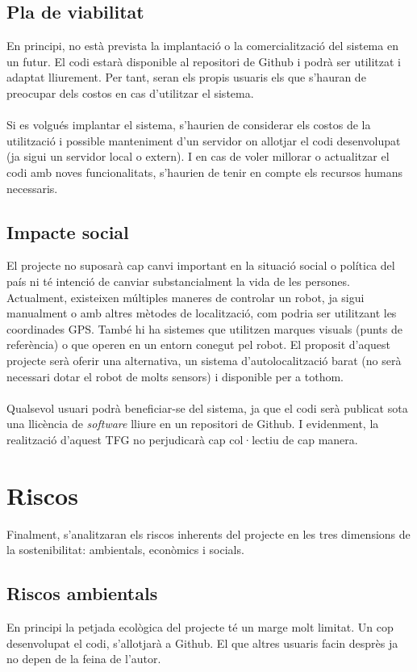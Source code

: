 	\subsection{Pla de viabilitat}
		En principi, no està prevista la implantació o la comercialització del sistema en un futur. El codi estarà disponible al repositori de Github i podrà ser utilitzat i adaptat lliurement. Per tant,
		seran els propis usuaris els que s'hauran de preocupar dels costos en cas d'utilitzar el sistema.\\\\
		Si es volgués implantar el sistema, s'haurien de considerar els costos de la utilització i possible manteniment d'un servidor on allotjar el codi desenvolupat (ja sigui un servidor local o extern). I en
		cas de voler millorar o actualitzar el codi amb noves funcionalitats, s'haurien de tenir en compte els recursos humans necessaris.

	\subsection{Impacte social}
		El projecte no suposarà cap canvi important en la situació social o política del país ni té intenció de canviar substancialment la vida de les persones. Actualment, existeixen múltiples maneres de
		controlar un robot, ja sigui manualment o amb altres mètodes de localització, com podria ser utilitzant les coordinades GPS. També hi ha sistemes que utilitzen marques visuals (punts de referència)
		o que operen en un entorn conegut pel robot. El proposit d'aquest projecte serà oferir una alternativa, un sistema d'autolocalització barat (no serà necessari dotar el robot de molts sensors)
		i disponible per a tothom.\\\\
		Qualsevol usuari podrà beneficiar-se del sistema, ja que el codi serà publicat sota una llicència de \textit{software} lliure en un repositori de Github. I evidenment, la realització d'aquest TFG
		no perjudicarà cap col·lectiu de cap manera.

\section{Riscos}
	Finalment, s'analitzaran els riscos inherents del projecte en les tres dimensions de la sostenibilitat: ambientals, econòmics i socials.
	\subsection{Riscos ambientals}
		En principi la petjada ecològica del projecte té un marge molt limitat. Un cop desenvolupat el codi, s'allotjarà a Github. El que altres usuaris facin desprès ja no depen de la feina de l'autor.

